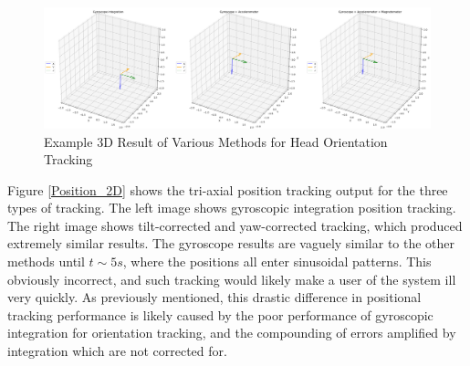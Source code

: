 \documentclass[11pt,a4paper]{article}
\begin{document}
	\begin{figure}[h!]
		\centering
		\includegraphics[width=1.0\linewidth]{figures/Position_Tracking_First_Y_Rotation}
		\caption{Example 3D Result of Various Methods for Head Orientation Tracking}
		\label{Position_Y_Rotation}
	\end{figure}

	Figure \ref{Position_2D} shows the tri-axial position tracking output for the three types of tracking. The left image shows gyroscopic integration position tracking. The right image shows tilt-corrected and yaw-corrected tracking, which produced extremely similar results. The gyroscope results are vaguely similar to the other methods until $t\sim5s$, where the positions all enter sinusoidal patterns. This obviously incorrect, and such tracking would likely make a user of the system ill very quickly. As previously mentioned, this drastic difference in positional tracking performance is likely caused by the poor performance of gyroscopic integration for orientation tracking, and the compounding of errors amplified by integration which are not corrected for.
	
\end{document}
